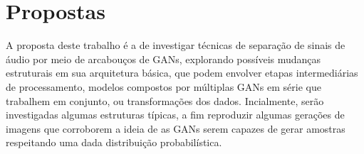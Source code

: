 \section{Propostas}
\label{sec:gan_for_bss_propositions}

A proposta deste trabalho é a de investigar técnicas de separação de sinais de áudio por meio de arcabouços de GANs, explorando possíveis mudanças estruturais em sua arquitetura básica, que podem envolver etapas intermediárias de processamento, modelos compostos por múltiplas GANs em série que trabalhem em conjunto, ou transformações dos dados. Incialmente, serão investigadas algumas estruturas típicas, a fim reproduzir algumas gerações de imagens que corroborem a ideia de as GANs serem capazes de gerar amostras respeitando uma dada distribuição probabilística. 